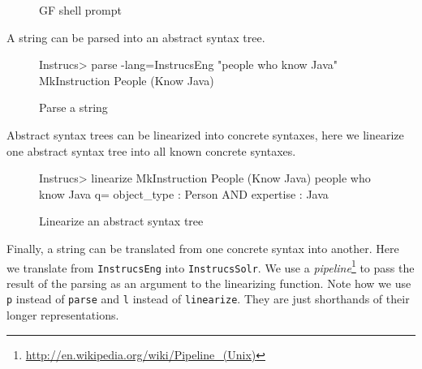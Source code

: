 \begin{figure}[H]

\caption{GF shell prompt\label{fig:gf-shell}}
\end{figure}

A string can be parsed into an abstract syntax tree.

\begin{figure}[H]
\begin{terminal}
Instrucs> parse -lang=InstrucsEng "people who know Java"
MkInstruction People (Know Java)
\end{terminal}

\caption{Parse a string\label{fig:parse-a-string}}
\end{figure}

Abstract syntax trees can be linearized into concrete syntaxes, here we linearize one abstract syntax tree into all known concrete syntaxes.

\begin{figure}[H]
\begin{terminal}
Instrucs> linearize MkInstruction People (Know Java)
people who know Java
q= object_type : Person AND expertise : Java
\end{terminal}

\caption{Linearize an abstract syntax tree\label{fig:linearization}}
\end{figure}

Finally, a string can be translated from one concrete syntax into another. Here we translate from \texttt{InstrucsEng} into \texttt{InstrucsSolr}. We use a \emph{pipeline}\footnote{\url{http://en.wikipedia.org/wiki/Pipeline_(Unix)}} to pass the result of the parsing as an argument to the linearizing function. Note how we use \texttt{p} instead of \texttt{parse} and \texttt{l} instead of \texttt{linearize}. They are just shorthands of their longer representations.

